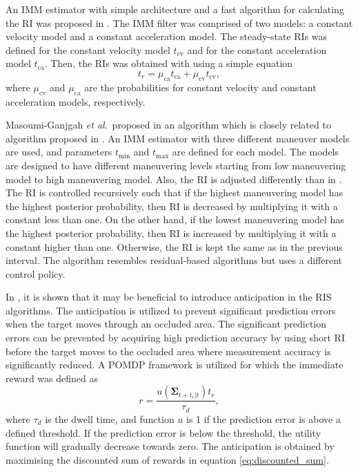 \documentclass[english, 12pt, a4paper, elec, utf8, a-1b, online]{aaltothesis}
\renewcommand{\vec}[1]{\mathbf{#1}}
\newcommand{\etal}{\textit{et al}.~}
\newcommand{\tmax}{t_\text{max}}
\newcommand{\tmin}{t_\text{min}}
\newcommand{\muca}{\mu_{\text{ca}}}
\newcommand{\mucv}{\mu_{\text{cv}}}
\newcommand{\ri}{t_r}
\begin{document}
 An IMM estimator with simple architecture and a fast algorithm for calculating the RI was proposed in \cite{Benoudnine2006}.
The IMM filter was comprised of two models: a constant velocity model and a constant acceleration model.
The steady-state RIs was defined for the constant velocity model $t_\text{cv}$ and for the constant acceleration model $t_\text{ca}$.
Then, the RIs was obtained with using a simple equation
\begin{equation}\label{eq:fimm}
    \ri = \muca t_\text{ca} + \mucv t_\text{cv},
\end{equation}
where $\mucv$ and $\muca$ are the probabilities for constant velocity and constant acceleration models, respectively.

Masoumi-Ganjgah \etal proposed in \cite{MasoumiGanjgah2017} an algorithm which is closely related to algorithm proposed in \cite{Benoudnine2006}.
An IMM estimator with three different maneuver models are used, and parameters $\tmin$ and $\tmax$ are defined for each model.
The models are designed to have different maneuvering levels starting from low maneuvering model to high maneuvering model.
Also, the RI is adjusted differently than in \cite{Benoudnine2006}.
The RI is controlled recursively such that if the highest maneuvering model has the highest posterior probability, then RI is decreased by multiplying it with a constant less than one.
On the other hand, if the lowest maneuvering model has the highest posterior probability, then RI is increased by multiplying it with a constant higher than one.
Otherwise, the RI is kept the same as in the previous interval.
The algorithm resembles residual-based algorithms but uses a different control policy.

In \cite{Charlish2015}, it is shown that it may be beneficial to introduce anticipation in the RIS algorithms.
The anticipation is utilized to prevent significant prediction errors when the target moves through an occluded area.
The significant prediction errors can be prevented by acquiring high prediction accuracy by using short RI before the target moves to the occluded area where measurement accuracy is significantly reduced.
A POMDP framework is utilized for which the immediate reward was defined as
\begin{equation}
    r = \frac{u\left(\vec{\Sigma}_{t+\ri|t} \right) \ri}{\tau_d},
\end{equation}
where $\tau_d$ is the dwell time, and function $u$ is 1 if the prediction error is above a defined threshold.
If the prediction error is below the threshold, the utility function will gradually decrease towards zero.
The anticipation is obtained by maximising the discounted sum of rewards in equation \eqref{eq:discounted_sum}.
\end{document}
